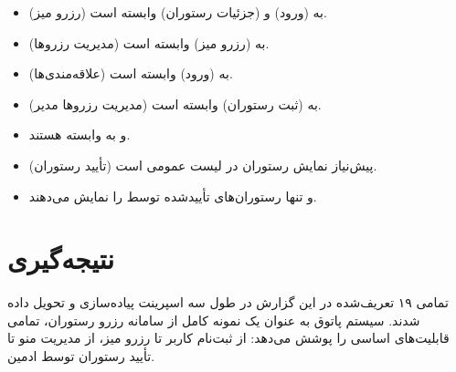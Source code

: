 \documentclass[12pt, a4paper]{article}
\begin{document}
\begin{itemize}[rightmargin=0.5cm]
  \item {} (رزرو میز) به  (ورود) و  (جزئیات رستوران) وابسته است.
  \item {} (مدیریت رزروها) به  (رزرو میز) وابسته است.
  \item {} (علاقه‌مندی‌ها) به  (ورود) وابسته است.
  \item {} (مدیریت رزروها مدیر) به  (ثبت رستوران) وابسته است.
  \item {} و  به  وابسته هستند.
  \item {} (تأیید رستوران) پیش‌نیاز نمایش رستوران در لیست عمومی است.
  \item {} و  تنها رستوران‌های تأییدشده توسط  را نمایش می‌دهند.
\end{itemize}

\section{نتیجه‌گیری}

تمامی ۱۹  تعریف‌شده در این گزارش در طول سه اسپرینت پیاده‌سازی و تحویل داده شدند.
سیستم پاتوق به عنوان یک نمونه کامل از سامانه رزرو رستوران، تمامی قابلیت‌های اساسی را پوشش می‌دهد:
از ثبت‌نام کاربر تا رزرو میز، از مدیریت منو تا تأیید رستوران توسط ادمین.
\end{document}
